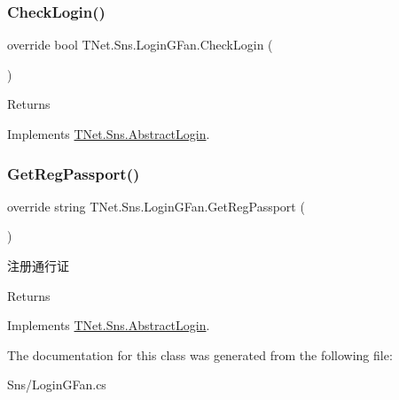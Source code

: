 \subsubsection{\texorpdfstring{Check\+Login()}{CheckLogin()}}
{\footnotesize\ttfamily override bool T\+Net.\+Sns.\+Login\+G\+Fan.\+Check\+Login (\begin{DoxyParamCaption}{ }\end{DoxyParamCaption})\hspace{0.3cm}{\ttfamily [virtual]}}





\begin{DoxyReturn}{Returns}

\end{DoxyReturn}


Implements \mbox{\hyperlink{class_t_net_1_1_sns_1_1_abstract_login_a6b5dac3d6d46efb7b1e4049e674105e5}{T\+Net.\+Sns.\+Abstract\+Login}}.

\mbox{\label{class_t_net_1_1_sns_1_1_login_g_fan_aaa467dca1a6f8fc8eb55139f9bfad0ca}} 
\subsubsection{\texorpdfstring{Get\+Reg\+Passport()}{GetRegPassport()}}
{\footnotesize\ttfamily override string T\+Net.\+Sns.\+Login\+G\+Fan.\+Get\+Reg\+Passport (\begin{DoxyParamCaption}{ }\end{DoxyParamCaption})\hspace{0.3cm}{\ttfamily [virtual]}}



注册通行证 

\begin{DoxyReturn}{Returns}

\end{DoxyReturn}


Implements \mbox{\hyperlink{class_t_net_1_1_sns_1_1_abstract_login_a3930eb564bb4804e1b646d749f20907a}{T\+Net.\+Sns.\+Abstract\+Login}}.



The documentation for this class was generated from the following file\+:\begin{DoxyCompactItemize}
\item 
Sns/Login\+G\+Fan.\+cs\end{DoxyCompactItemize}

